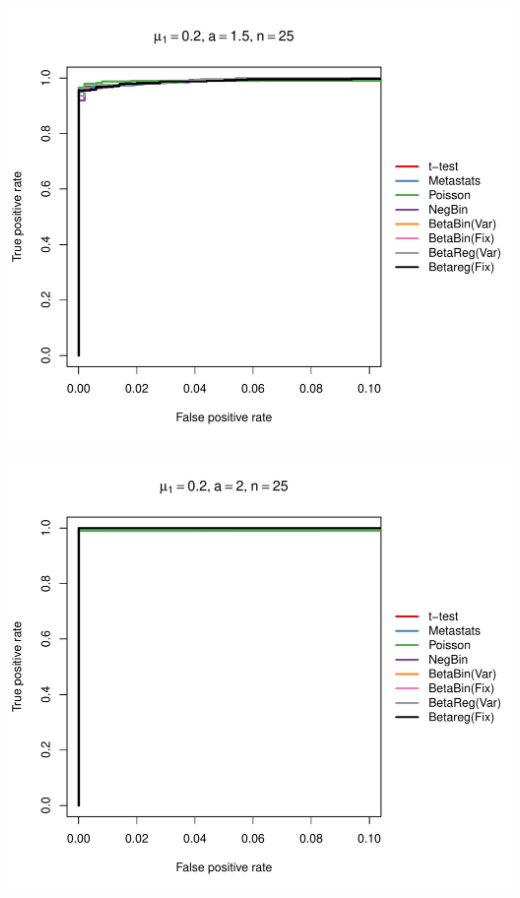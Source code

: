 \documentclass[12pt]{article}\usepackage{graphicx, color}
\makeatletter
\def\maxwidth{ %
  \ifdim\Gin@nat@width>\linewidth
    \linewidth
  \else
    \Gin@nat@width
  \fi
}
\newenvironment{knitrout}{}{} %
\makeatother
\begin{document}
\begin{knitrout}
{\centering \includegraphics[width=\maxwidth]{figure/rocs25} 

}




{\centering \includegraphics[width=\maxwidth]{figure/rocs26} 

}





\end{knitrout}
\end{document}
